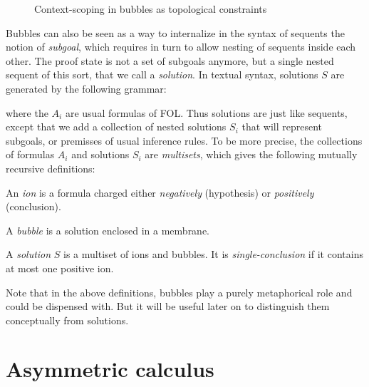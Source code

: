 \begin{figure}
  \caption{Context-scoping in bubbles as topological constraints}
\end{figure}

Bubbles can also be seen as a way to internalize in the syntax of sequents the
notion of \emph{subgoal}, which requires in turn to allow nesting of sequents
inside each other. The proof state is not a set of subgoals anymore, but a
single nested sequent of this sort, that we call a \emph{solution}. In textual syntax, solutions $S$ are generated by the
following grammar:
where the $A_i$ are usual formulas of FOL. Thus solutions are just like
sequents, except that we add a collection of nested solutions $S_i$ that will
represent subgoals, or premisses of usual inference rules. To be more precise,
the collections of formulas $A_i$ and solutions $S_i$ are \emph{multisets},
which gives the following mutually recursive definitions:
\begin{definition}[Ion]
  An \emph{ion} is a formula charged either \emph{negatively} (hypothesis) or
  \emph{positively} (conclusion).
\end{definition}
\begin{definition}[Bubble]
  A \emph{bubble} is a solution enclosed in a membrane.
\end{definition}
\begin{definition}[Solution]
  A \emph{solution} $S$ is a multiset of ions and bubbles. It is
  \emph{single-conclusion} if it contains at most one positive ion.
\end{definition}
Note that in the above definitions, bubbles play a purely metaphorical role and
could be dispensed with. But it will be useful later on to distinguish them
conceptually from solutions.

\section{Asymmetric calculus}

